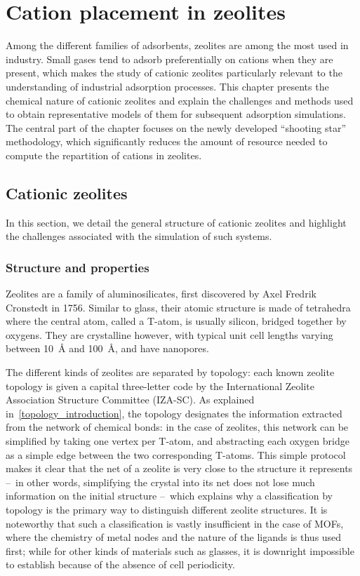 \documentclass[main.tex]{subfiles}
\begin{document}
\chapter{Cation placement in zeolites}
\vspace*{-1\baselineskip}

Among the different families of adsorbents, zeolites are among the most used in industry. Small gases tend to adsorb preferentially on cations when they are present, which makes the study of cationic zeolites particularly relevant to the understanding of industrial adsorption processes. This chapter presents the chemical nature of cationic zeolites and explain the challenges and methods used to obtain representative models of them for subsequent adsorption simulations. The central part of the chapter focuses on the newly developed ``shooting star'' methodology, which significantly reduces the amount of resource needed to compute the repartition of cations in zeolites.

\section{Cationic zeolites}

In this section, we detail the general structure of cationic zeolites and highlight the challenges associated with the simulation of such systems.

\subsection{Structure and properties}

Zeolites are a family of aluminosilicates, first discovered by Axel Fredrik Cronstedt in 1756. Similar to glass, their atomic structure is made of tetrahedra where the central atom, called a T-atom, is usually silicon, bridged together by oxygens. They are crystalline however, with typical unit cell lengths varying between \qty{10}{\angstrom} and \qty{100}{\angstrom}, and have nanopores.

The different kinds of zeolites are separated by topology: each known zeolite topology is given a capital three-letter code by the International Zeolite Association Structure Committee (IZA-SC). As explained in~\autoref{topology_introduction}, the topology designates the information extracted from the network of chemical bonds: in the case of zeolites, this network can be simplified by taking one vertex per T-atom, and abstracting each oxygen bridge as a simple edge between the two corresponding T-atoms. This simple protocol makes it clear that the net of a zeolite is very close to the structure it represents --~in other words, simplifying the crystal into its net does not lose much information on the initial structure --~which explains why a classification by topology is the primary way to distinguish different zeolite structures. It is noteworthy that such a classification is vastly insufficient in the case of MOFs, where the chemistry of metal nodes and the nature of the ligands is thus used first; while for other kinds of materials such as glasses, it is downright impossible to establish because of the absence of cell periodicity.
\end{document}
